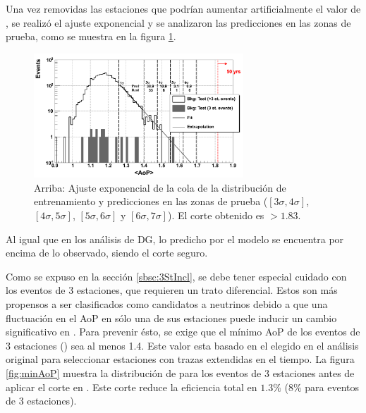	Una vez removidas las estaciones que podrían aumentar artificialmente el valor de \aop{}, se realizó el ajuste exponencial y se analizaron las predicciones en las zonas de prueba, como se muestra en la figura \ref{fig:fitExpoES}.
	\begin{figure}[ht]
	\begin{center}
	\includegraphics[width=0.7\textwidth]{fig/seleccionAuger/fitExponential_test_with3st_forThesis}
	\caption{Arriba: Ajuste exponencial de la cola de la distribución de entrenamiento y predicciones en las zonas de prueba ($[3\sigma,4\sigma]$, $[4\sigma,5\sigma]$, $[5\sigma,6\sigma]$ y $[6\sigma,7\sigma]$). El corte obtenido es \aop{}$>1.83$.}
	\label{fig:fitExpoES}
	\end{center}
	\end{figure}
	Al igual que en los análisis de DG, lo predicho por el modelo se encuentra por encima de lo observado, siendo el corte seguro.
	
	Como se expuso en la sección \ref{sbsc:3StIncl}, se debe tener especial cuidado con los eventos de 3 estaciones, que requieren un trato diferencial.
	Estos son m\'as propensos a ser clasificados como candidatos a neutrinos debido a que una fluctuación en el AoP en sólo una de sus estaciones puede inducir un cambio significativo en \aop{}.
	Para prevenir ésto, se exige que el mínimo AoP de los eventos de 3 estaciones (\aopmin{}) sea al menos 1.4.
	Este valor esta basado en el elegido en el análisis original para seleccionar estaciones con trazas extendidas en el tiempo.
	La figura \ref{fig:minAoP} muestra la distribución de \aopmin{} para los eventos de 3 estaciones antes de aplicar el corte en \aop{}.	Este corte reduce la eficiencia total en $1.3\%$ ($8\%$ para eventos de 3 estaciones).

